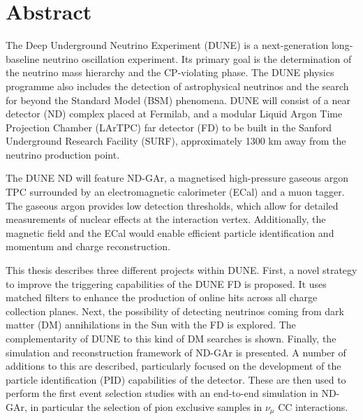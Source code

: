 \chapter*{Abstract}
\label{C:Abstract}

The Deep Underground Neutrino Experiment (DUNE) is a next-generation long-baseline neutrino oscillation experiment. Its primary goal is the determination of the neutrino mass hierarchy and the CP-violating phase. The DUNE physics programme also includes the detection of astrophysical neutrinos and the search for beyond the Standard Model (BSM) phenomena. DUNE will consist of a near detector (ND) complex placed at Fermilab, and a modular Liquid Argon Time Projection Chamber (LArTPC) far detector (FD) to be built in the Sanford Underground Research Facility (SURF), approximately 1300 km away from the neutrino production point.

The DUNE ND will feature ND-GAr, a magnetised high-pressure gaseous argon TPC surrounded by an electromagnetic calorimeter (ECal) and a muon tagger. The gaseous argon provides low detection thresholds, which allow for detailed measurements of nuclear effects at the interaction vertex. Additionally, the magnetic field and the ECal would enable efficient particle identification and momentum and charge reconstruction.

This thesis describes three different projects within DUNE. First, a novel strategy to improve the triggering capabilities of the DUNE FD is proposed. It uses matched filters to enhance the production of online hits across all charge collection planes. Next, the possibility of detecting neutrinos coming from dark matter (DM) annihilations in the Sun with the FD is explored. The complementarity of DUNE to this kind of DM searches is shown. Finally, the simulation and reconstruction framework of ND-GAr is presented. A number of additions to this are described, particularly focused on the development of the particle identification (PID) capabilities of the detector. These are then used to perform the first event selection studies with an end-to-end simulation in ND-GAr, in particular the selection of pion exclusive samples in $\nu_{\mu}$ CC interactions.